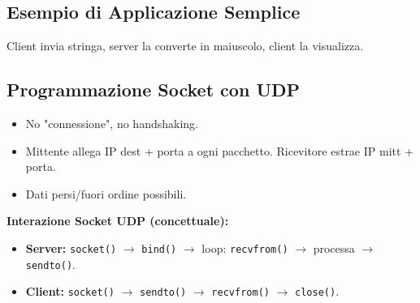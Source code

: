 \subsection{Esempio di Applicazione Semplice}
Client invia stringa, server la converte in maiuscolo, client la visualizza.

\subsection{Programmazione Socket con UDP}
\begin{itemize}
    \item No "connessione", no handshaking.
    \item Mittente allega IP dest + porta a ogni pacchetto. Ricevitore estrae IP mitt + porta.
    \item Dati persi/fuori ordine possibili.
\end{itemize}
\textbf{Interazione Socket UDP (concettuale):}
\begin{itemize}
    \item \textbf{Server:} \texttt{socket()} $\rightarrow$ \texttt{bind()} $\rightarrow$ loop: \texttt{recvfrom()} $\rightarrow$ processa $\rightarrow$ \texttt{sendto()}.
    \item \textbf{Client:} \texttt{socket()} $\rightarrow$ \texttt{sendto()} $\rightarrow$ \texttt{recvfrom()} $\rightarrow$ \texttt{close()}.
\end{itemize}
